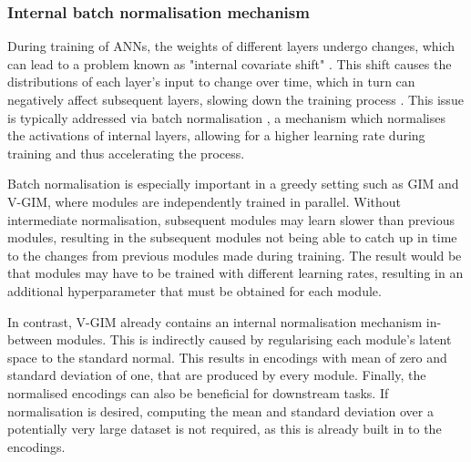 
	
	\subsubsection{Internal batch normalisation mechanism} \label{cha:vgim_batch_norm}
		During training of ANNs, the weights of different layers undergo changes, which can lead to a problem known as "internal covariate shift" \cite{ioffeBatchNormalizationAccelerating2015}. This shift causes the distributions of each layer's input to change over time, which in turn can negatively affect subsequent layers, slowing down the training process \cite{bjorckUnderstandingBatchNormalization2018, lecunEfficientBackProp1998}. This issue is typically addressed via batch normalisation \cite{santurkarHowDoesBatch2018, bjorckUnderstandingBatchNormalization2018}, a mechanism which normalises the activations of internal layers, allowing for a higher learning rate during training and thus accelerating the process.
			
		Batch normalisation is especially important in a greedy setting such as GIM and V-GIM, where modules are independently trained in parallel. Without intermediate normalisation, subsequent modules may learn slower than previous modules, resulting in the subsequent modules not being able to catch up in time to the changes from previous modules made during training. The result would be that modules may have to be trained with different learning rates, resulting in an additional hyperparameter that must be obtained for each module.
		
		In contrast, V-GIM already contains an internal normalisation mechanism in-between modules. This is indirectly caused by regularising each module's latent space to the standard normal. This results in encodings with mean of zero and standard deviation of one, that are produced by every module. Finally, the normalised encodings can also be beneficial for downstream tasks. If normalisation is desired, computing the mean and standard deviation over a potentially very large dataset is not required, as this is already built in to the encodings.

